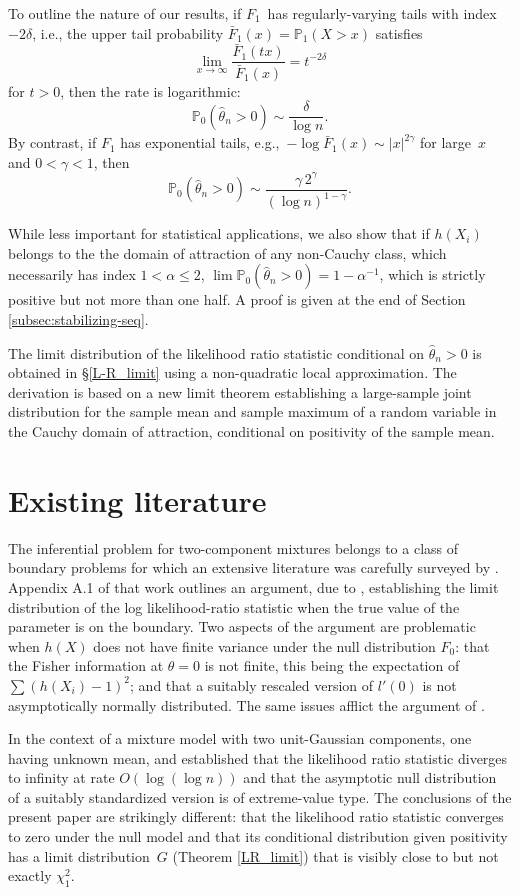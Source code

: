 \documentclass[11pt]{article}
\theoremstyle{definition}
\def\Prob{{\mathbb P}}
\begin{document}
To outline the nature of our results, if $F_1$~has regularly-varying tails with index $-2\delta$, i.e., the upper tail probability $\bar{F}_1(x)=\Prob_1(X>x)$ satisfies 
\[
\lim_{x\rightarrow \infty} \frac{\bar{F}_1(tx)}{\bar{F}_1(x)}=t^{-2\delta}
\]
for $t > 0$, then the rate is logarithmic:
\[
\Prob_0(\hat\theta_n > 0) \sim\frac {\delta} {\log n}.
\]
By contrast, if $F_1$ has exponential tails, e.g.,~$-\log \bar F_1(x) \sim |x|^{2\gamma}$ for large~$x$ and $0 < \gamma < 1$, then
\[
\Prob_0(\hat\theta_n > 0) \sim\frac {\gamma\, 2^\gamma} {(\log n)^{1-\gamma}}.
\]

While less important for statistical applications, we also show that if $h(X_i)$ belongs to the the domain of attraction of any non-Cauchy class, which necessarily has index $1 < \alpha \le 2$, $\lim \Prob_0(\hat\theta_n > 0) = 1 - \alpha^{-1}$, which is strictly positive but not more than one half. A proof is given at the end of Section \ref{subsec:stabilizing-seq}.


The limit distribution of the likelihood ratio statistic conditional on $\hat\theta_n > 0$ is obtained in \S \ref{L-R_limit} using a non-quadratic local approximation. The derivation is based on a new limit theorem establishing a large-sample joint distribution for the sample mean and sample maximum of a random variable in the Cauchy domain of attraction, conditional on positivity of the sample mean. 


\section{Existing literature}

The inferential problem for two-component mixtures belongs to a class of boundary problems for which an extensive literature was carefully surveyed by \citet{Brazzale}. Appendix A.1 of that work outlines an argument, due to \citet{SelfLiang1987}, establishing the limit distribution of the log likelihood-ratio statistic when the true value of the parameter is on the boundary. Two aspects of the argument are problematic when $h(X)$ does not have finite variance under the null distribution $F_0$: that the Fisher information at $\theta=0$ is not finite, this being the expectation of $\sum (h(X_i)-1)^2$; and that a suitably rescaled version of $l'(0)$ is not asymptotically normally distributed. The same issues afflict the argument of \citet{GS1985} \citep[see][Appendix A.3]{Brazzale}.

In the context of a mixture model with two unit-Gaussian components, one having unknown mean, \citet{Bickel} and \citet{LiuShao} established that the likelihood ratio statistic diverges to infinity at rate $O(\log(\log n))$ and that the asymptotic null distribution of a suitably standardized version is of extreme-value type. The conclusions of the present paper are strikingly different: that the likelihood ratio statistic converges to zero under the null model and that its conditional distribution given positivity has a limit distribution~$G$ (Theorem \ref{LR_limit}) that is visibly close to but not exactly $\chi_1^2$. 
\end{document}
